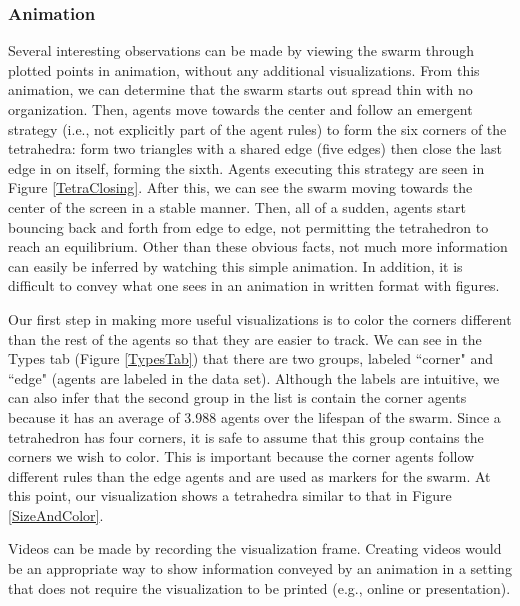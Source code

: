 \documentclass[conference]{IEEEtran}
\begin{document}
\subsubsection{Animation}
Several interesting observations can be made by viewing the swarm through plotted points in animation, without
any additional visualizations.
From this animation, we can determine that the swarm starts out spread thin with no organization.
Then, agents move towards the center and follow an emergent strategy (i.e., not explicitly part of the agent rules)
to form the six corners of the tetrahedra: form two triangles with a shared edge (five edges) then close the last edge
in on itself, forming the sixth. Agents executing this strategy are seen in Figure \ref{TetraClosing}.
After this, we can see the swarm moving towards the center of the screen in a stable manner.
Then, all of a sudden, agents start bouncing back and forth from edge to edge, not permitting the tetrahedron to
reach an equilibrium.
Other than these obvious facts, not much more information can easily be inferred by watching this simple animation.
In addition, it is difficult to convey what one sees in an animation in written format with figures.

Our first step in making more useful visualizations is to color the corners different than the rest of the agents so that
they are easier to track. We can see in the Types tab (Figure \ref{TypesTab}) that there are two groups, labeled
``corner" and ``edge" (agents are labeled in the data set).
Although the labels are intuitive, we can also infer that the second group in the list
is contain the corner agents because it has an average of 3.988 agents over the lifespan of the swarm.
Since a tetrahedron has four corners, it is safe to assume that this group contains the corners we wish to color.
This is important because the corner agents follow different rules than the edge agents and are used as markers for the swarm.
At this point, our visualization shows a tetrahedra similar to that in Figure \ref{SizeAndColor}.

Videos can be made by recording the visualization frame.
Creating videos would be an appropriate way to show information conveyed by an animation in a setting that does not
require the visualization to be printed (e.g., online or presentation).
\end{document}
